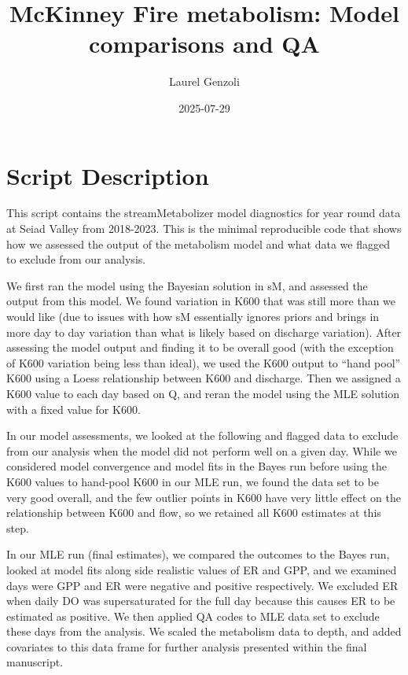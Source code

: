 \documentclass[
  letterpaper,
  DIV=11,
  numbers=noendperiod]{scrartcl}
\title{McKinney Fire metabolism: Model comparisons and QA}
\author{Laurel Genzoli}
\date{2025-07-29}
\renewcommand*\contentsname{Table of contents}
\newcommand\contentsname{Table of contents}
\begin{document}
\maketitle

\renewcommand*\contentsname{Table of contents}
{
\hypersetup{linkcolor=}
\setcounter{tocdepth}{3}
\tableofcontents
}

\section{Script Description}\label{script-description}

This script contains the streamMetabolizer model diagnostics for year
round data at Seiad Valley from 2018-2023. This is the minimal
reproducible code that shows how we assessed the output of the
metabolism model and what data we flagged to exclude from our analysis.

We first ran the model using the Bayesian solution in sM, and assessed
the output from this model. We found variation in K600 that was still
more than we would like (due to issues with how sM essentially ignores
priors and brings in more day to day variation than what is likely based
on discharge variation). After assessing the model output and finding it
to be overall good (with the exception of K600 variation being less than
ideal), we used the K600 output to ``hand pool'' K600 using a Loess
relationship between K600 and discharge. Then we assigned a K600 value
to each day based on Q, and reran the model using the MLE solution with
a fixed value for K600.

In our model assessments, we looked at the following and flagged data to
exclude from our analysis when the model did not perform well on a given
day. While we considered model convergence and model fits in the Bayes
run before using the K600 values to hand-pool K600 in our MLE run, we
found the data set to be very good overall, and the few outlier points
in K600 have very little effect on the relationship between K600 and
flow, so we retained all K600 estimates at this step.

In our MLE run (final estimates), we compared the outcomes to the Bayes
run, looked at model fits along side realistic values of ER and GPP, and
we examined days were GPP and ER were negative and positive
respectively. We excluded ER when daily DO was supersaturated for the
full day because this causes ER to be estimated as positive. We then
applied QA codes to MLE data set to exclude these days from the
analysis. We scaled the metabolism data to depth, and added covariates
to this data frame for further analysis presented within the final
manuscript.
\end{document}
